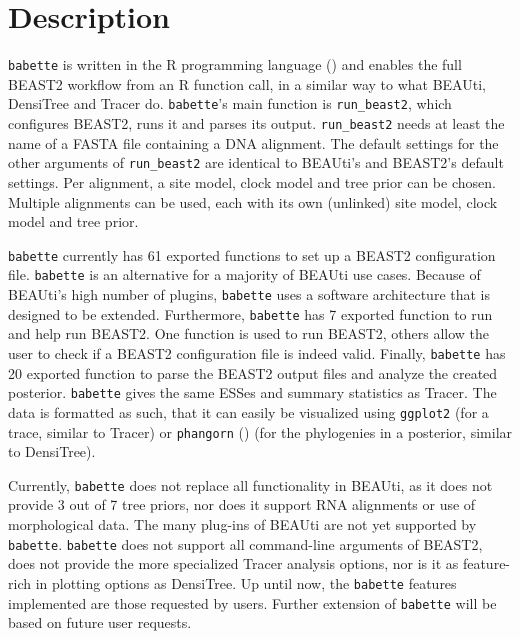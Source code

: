 \documentclass{article}
\begin{document}
\section{Description}

\verb;babette; is written in the R programming language (\cite{R})
and enables the full BEAST2 workflow from an R function call,
in a similar way to what BEAUti, DensiTree and Tracer do.
\verb;babette;'s main function is \verb;run_beast2;, which
configures BEAST2, runs it and parses its output. 
\verb;run_beast2; needs at least the name of a 
FASTA file containing a DNA alignment. 
The default settings for the other arguments of \verb;run_beast2; 
are identical to BEAUti's and BEAST2's default settings.
Per alignment, a site model, clock model and tree prior can be chosen.
Multiple alignments can be used, each with its own (unlinked) site model, 
clock model and tree prior.

\verb;babette; currently has 61 exported functions to set up  
a BEAST2 configuration file. 
\verb;babette; is an alternative for a majority of BEAUti use cases.
Because of BEAUti's high number of plugins, 
\verb;babette; uses a software architecture that is designed to be extended.
Furthermore, \verb;babette; has 7 exported function to run and help run BEAST2.
One function is used to run BEAST2, others
allow the user to check if a BEAST2 configuration file is indeed valid.
Finally, \verb;babette; has 20 exported function to parse the BEAST2 output
files and analyze the created posterior. \verb;babette; gives the
same ESSes and summary statistics as Tracer. The data is formatted
as such, that it can easily be visualized using \verb;ggplot2; (for a trace,
similar to Tracer) or \verb;phangorn; (\cite{phangorn}) (for 
the phylogenies in a posterior, similar to DensiTree). 

Currently, \verb;babette; does not replace all functionality in BEAUti,
as it does not provide 3 out of 7 tree priors, nor does it support RNA
alignments or use of morphological data. The many plug-ins of BEAUti
are not yet supported by \verb;babette;. \verb;babette; does not support
all command-line arguments of BEAST2, does not provide
the more specialized Tracer analysis options, nor is it as feature-rich
in plotting options as DensiTree. Up until now, the \verb;babette; features 
implemented are those requested by users. Further extension of \verb;babette; 
will be based on future user requests.
\end{document}
